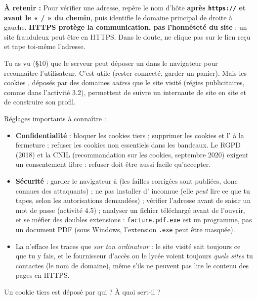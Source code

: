 \documentclass[11pt,a4paper]{article}
\newif\ifprof
\newcommand{\soussect}[1]{\par\addvspace{6pt}{\color{navy}\large\bfseries #1\par}\vspace{3pt}}
\newcommand{\trou}[2][3cm]{\ifprof\textcolor{corr}{\underline{\textbf{\,#2\,}}}\else\underline{\hspace{#1}}\fi}
\newcommand{\lignes}[1]{\par\foreach \i in {1,...,#1}{\vspace{8.5mm}\hrule height 0.3pt}\vspace{2mm}}
\newcommand{\reponse}[2]{\ifprof\par{\raggedright\textcolor{corr}{#2}\par}\else\lignes{#1}\fi}
\newcommand{\aretenir}[1]{\begin{retenir}\raggedright\textbf{À retenir :} #1\end{retenir}}
\begin{document}
\aretenir{Pour vérifier une adresse, repère le nom d'hôte \textbf{après \texttt{https://} et avant le « / » du chemin}, puis identifie le domaine principal de droite à gauche. \textbf{HTTPS protège la communication, pas l'honnêteté du site} : un site frauduleux peut être en HTTPS. Dans le doute, ne clique pas sur le lien reçu et tape toi-même l'adresse.}

\soussect{Régler son navigateur}

Tu as vu (§10) que le serveur peut déposer un \trou[2cm]{cookie} dans le navigateur pour reconnaître l'utilisateur. C'est utile (rester connecté, garder un panier). Mais les cookies \trou[2cm]{tiers}, déposés par des domaines \emph{autres} que le site visité (régies publicitaires, comme dans l'activité 3.2), permettent de suivre un internaute de site en site et de construire son profil.

Réglages importants à connaître :
\begin{itemize}
\item \textbf{Confidentialité} : bloquer les cookies tiers ; supprimer les cookies et l'\trou[2.2cm]{historique} à la fermeture ; refuser les cookies non essentiels dans les bandeaux. Le RGPD (2018) et la CNIL (recommandation sur les cookies, septembre 2020) exigent un consentement libre : refuser doit être aussi facile qu'accepter.
\item \textbf{Sécurité} : garder le navigateur à \trou[2.5cm]{jour} (les failles corrigées sont publiées, donc connues des attaquants) ; ne pas installer d'\trou[2cm]{extension} inconnue (elle \emph{peut} lire ce que tu tapes, selon les autorisations demandées) ; vérifier l'adresse avant de saisir un mot de passe (activité 4.5) ; analyser un fichier téléchargé avant de l'ouvrir, et se méfier des doubles extensions : \texttt{facture.pdf.exe} est un programme, pas un document PDF (sous Windows, l'extension \texttt{.exe} peut être masquée).
\item La \trou[3cm]{navigation privée} n'efface les traces que \emph{sur ton ordinateur} : le site visité sait toujours ce que tu y fais, et le fournisseur d'accès ou le lycée voient toujours \emph{quels sites} tu contactes (le nom de domaine), même s'ils ne peuvent pas lire le contenu des pages en HTTPS.
\end{itemize}

\begin{verifie}
Un cookie tiers est déposé par qui ? À quoi sert-il ?
\reponse{2}{Par un domaine autre que le site visité (régie publicitaire, outil de mesure d'audience) ; à reconnaître le même internaute de site en site et à construire son profil.}
\end{verifie}
\end{document}
